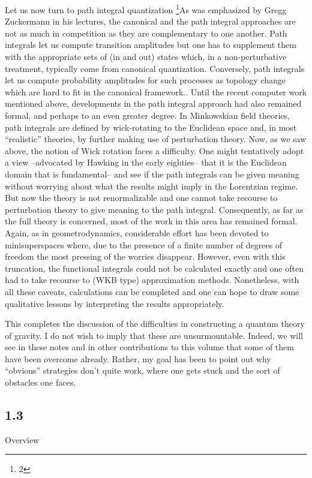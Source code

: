 Let us now turn to path integral quantization%
\footnote{2}{As was emphasized by Gregg Zuckermann in his lectures, the
canonical and the path integral approaches are not as much in competition
as they are complementary to one another. Path integrals let us compute
transition amplitudes but one has to supplement them with the appropriate
sets of (in and out) states which, in a non-perturbative treatment,
typically come from canonical quantization. Conversely, path integrals let
us compute probability amplitudes for such processes as topology change
which are hard to fit in the canonical framework.}.
Until the recent computer work mentioned above, developments in the path
integral approach had also remained formal,
and perhaps to an even greater degree. In Minkowskian field theories,
path integrals are defined by wick-rotating to the Euclidean space and,
in most ``realistic'' theories, by further making use of perturbation theory.
Now, as we saw above, the notion of Wick rotation faces a difficulty. One
might tentatively adopt a view --advocated by Hawking in the early eighties--
that it is the Euclidean domain that is fundamental-- and see if the path
integrals can be given meaning without worrying about what the results might
imply in the Lorentzian regime. But now the theory is not renormalizable
and one cannot take recourse to  perturbation theory to give meaning to
the path integral. Consequently, as far as the full theory is concerned, most
of the work in this area has remained formal. Again, as in geometrodynamics,
considerable effort has been devoted to minisuperspaces where, due to the
presence of a finite number of degrees of freedom the most pressing of the
worries disappear. However, even with this truncation, the functional
integrals could not be calculated exactly and one often had to take recourse
to (WKB type) approximation methods. Nonetheless, with all these caveats,
calculations can be completed and one can hope to draw some qualitative
lessons by interpreting the results appropriately.
\medskip

This completes the discussion of the difficulties in constructing a quantum
theory of gravity. I do not wish to imply that these are unsurmountable.
Indeed, we will see in these notes and in other contributions to this volume
that some of them have been overcome already. Rather, my goal has been to
point out why ``obvious'' strategies don't quite work, where one gets stuck
and the sort of obstacles one faces.

\goodbreak
\subsection{1.3}{Overview}

